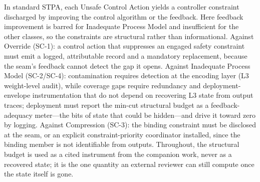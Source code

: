 \documentclass[11pt]{article}
\begin{document}
In standard STPA, each Unsafe Control Action yields a controller constraint discharged by improving the control algorithm or the feedback. Here feedback improvement is barred for Inadequate Process Model and insufficient for the other classes, so the constraints are structural rather than informational. Against Override (SC-1): a control action that suppresses an engaged safety constraint must emit a logged, attributable record and a mandatory replacement, because the seam's feedback cannot detect the gap it opens. Against Inadequate Process Model (SC-2/SC-4): contamination requires detection at the encoding layer (L3 weight-level audit), while coverage gaps require redundancy and deployment-envelope instrumentation that do not depend on recovering L3 state from output traces; deployment must report the min-cut structural budget as a feedback-adequacy meter---the bits of state that could be hidden---and drive it toward zero by logging. Against Compression (SC-3): the binding constraint must be disclosed at the seam, or an explicit constraint-priority coordinator installed, since the binding member is not identifiable from outputs. Throughout, the structural budget is used as a cited instrument from the companion work, never as a recovered state; it is the one quantity an external reviewer can still compute once the state itself is gone.
\end{document}
